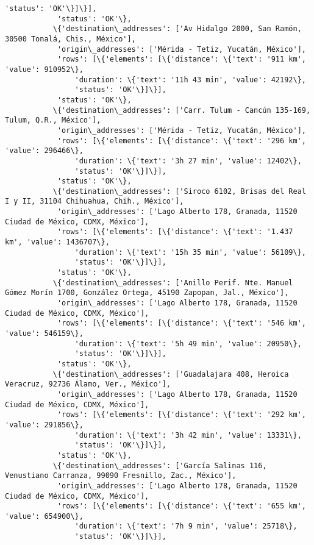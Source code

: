 \documentclass[11pt]{article}
\begin{document}
\begin{Verbatim}[commandchars=\\\{\}]
                'status': 'OK'\}]\}],
            'status': 'OK'\},
           \{'destination\_addresses': ['Av Hidalgo 2000, San Ramón, 30500 Tonalá, Chis., México'],
            'origin\_addresses': ['Mérida - Tetiz, Yucatán, México'],
            'rows': [\{'elements': [\{'distance': \{'text': '911 km', 'value': 910952\},
                'duration': \{'text': '11h 43 min', 'value': 42192\},
                'status': 'OK'\}]\}],
            'status': 'OK'\},
           \{'destination\_addresses': ['Carr. Tulum - Cancún 135-169, Tulum, Q.R., México'],
            'origin\_addresses': ['Mérida - Tetiz, Yucatán, México'],
            'rows': [\{'elements': [\{'distance': \{'text': '296 km', 'value': 296466\},
                'duration': \{'text': '3h 27 min', 'value': 12402\},
                'status': 'OK'\}]\}],
            'status': 'OK'\},
           \{'destination\_addresses': ['Siroco 6102, Brisas del Real I y II, 31104 Chihuahua, Chih., México'],
            'origin\_addresses': ['Lago Alberto 178, Granada, 11520 Ciudad de México, CDMX, México'],
            'rows': [\{'elements': [\{'distance': \{'text': '1.437 km', 'value': 1436707\},
                'duration': \{'text': '15h 35 min', 'value': 56109\},
                'status': 'OK'\}]\}],
            'status': 'OK'\},
           \{'destination\_addresses': ['Anillo Perif. Nte. Manuel Gómez Morín 1700, González Ortega, 45190 Zapopan, Jal., México'],
            'origin\_addresses': ['Lago Alberto 178, Granada, 11520 Ciudad de México, CDMX, México'],
            'rows': [\{'elements': [\{'distance': \{'text': '546 km', 'value': 546159\},
                'duration': \{'text': '5h 49 min', 'value': 20950\},
                'status': 'OK'\}]\}],
            'status': 'OK'\},
           \{'destination\_addresses': ['Guadalajara 408, Heroica Veracruz, 92736 Álamo, Ver., México'],
            'origin\_addresses': ['Lago Alberto 178, Granada, 11520 Ciudad de México, CDMX, México'],
            'rows': [\{'elements': [\{'distance': \{'text': '292 km', 'value': 291856\},
                'duration': \{'text': '3h 42 min', 'value': 13331\},
                'status': 'OK'\}]\}],
            'status': 'OK'\},
           \{'destination\_addresses': ['García Salinas 116, Venustiano Carranza, 99090 Fresnillo, Zac., México'],
            'origin\_addresses': ['Lago Alberto 178, Granada, 11520 Ciudad de México, CDMX, México'],
            'rows': [\{'elements': [\{'distance': \{'text': '655 km', 'value': 654900\},
                'duration': \{'text': '7h 9 min', 'value': 25718\},
                'status': 'OK'\}]\}],

\end{Verbatim}
\end{document}
